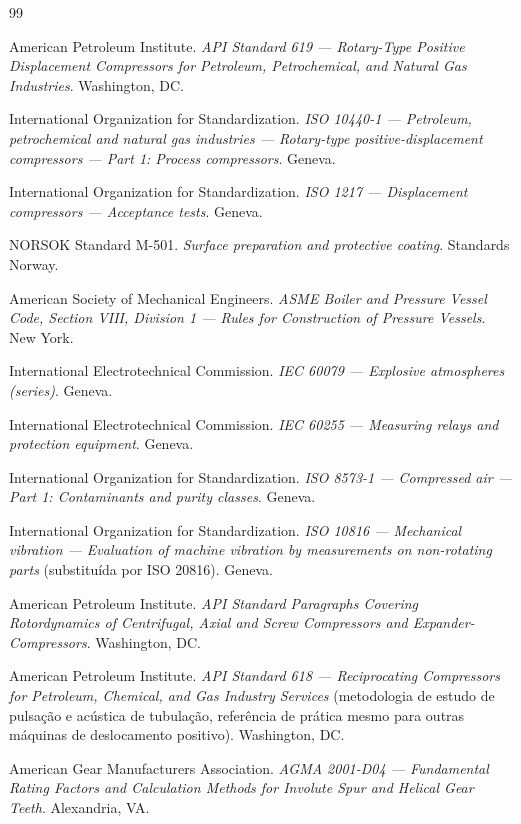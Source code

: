\documentclass[12pt,a4paper]{article}
\numberwithin{equation}{section}
\numberwithin{table}{section}
\numberwithin{figure}{section}
\begin{document}
\newpage
\begin{thebibliography}{99}

 American Petroleum Institute. \textit{API Standard 619 — Rotary-Type Positive Displacement Compressors for Petroleum, Petrochemical, and Natural Gas Industries}. Washington, DC.

 International Organization for Standardization. \textit{ISO 10440-1 — Petroleum, petrochemical and natural gas industries — Rotary-type positive-displacement compressors — Part 1: Process compressors}. Geneva.

 International Organization for Standardization. \textit{ISO 1217 — Displacement compressors — Acceptance tests}. Geneva.

 NORSOK Standard M-501. \textit{Surface preparation and protective coating}. Standards Norway.

 American Society of Mechanical Engineers. \textit{ASME Boiler and Pressure Vessel Code, Section VIII, Division 1 — Rules for Construction of Pressure Vessels}. New York.

 International Electrotechnical Commission. \textit{IEC 60079 — Explosive atmospheres (series)}. Geneva.

 International Electrotechnical Commission. \textit{IEC 60255 — Measuring relays and protection equipment}. Geneva.

 International Organization for Standardization. \textit{ISO 8573-1 — Compressed air — Part 1: Contaminants and purity classes}. Geneva.

 International Organization for Standardization. \textit{ISO 10816 — Mechanical vibration — Evaluation of machine vibration by measurements on non-rotating parts} (substituída por ISO 20816). Geneva.

 American Petroleum Institute. \textit{API Standard Paragraphs Covering Rotordynamics of Centrifugal, Axial and Screw Compressors and Expander-Compressors}. Washington, DC.

 American Petroleum Institute. \textit{API Standard 618 — Reciprocating Compressors for Petroleum, Chemical, and Gas Industry Services} (metodologia de estudo de pulsação e acústica de tubulação, referência de prática mesmo para outras máquinas de deslocamento positivo). Washington, DC.

 American Gear Manufacturers Association. \textit{AGMA 2001-D04 — Fundamental Rating Factors and Calculation Methods for Involute Spur and Helical Gear Teeth}. Alexandria, VA.


\end{thebibliography}
\end{document}
